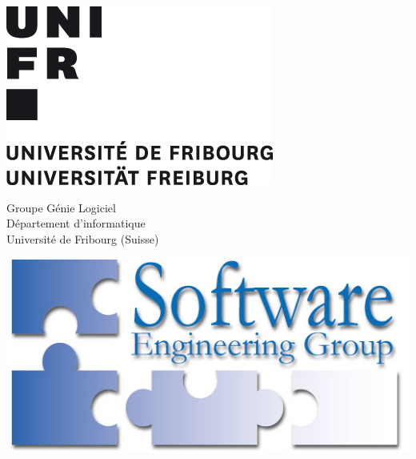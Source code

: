 \begin{titlepage}
\begin{center}
        \begin{minipage}[c]{0.2\textwidth}
            \includegraphics{logos/unifr_logo.png}   
        \end{minipage}
        \begin{minipage}[c]{0.4\textwidth}
            \normalsize
            Groupe Génie Logiciel\\
            Département d'informatique\\
            Université de Fribourg (Suisse)
        \end{minipage}
        \begin{minipage}[c]{0.3\textwidth}
            \includegraphics[scale=0.3]{logos/softeng.png}   
        \end{minipage}

             
    \end{center}
 \end{titlepage}